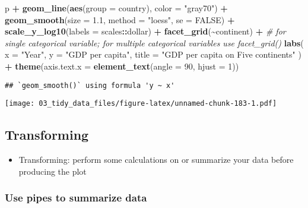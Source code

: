 \documentclass[
]{book}
\newenvironment{Shaded}{\begin{snugshade}}{\end{snugshade}}
\newcommand{\CommentTok}[1]{\textcolor[rgb]{0.56,0.35,0.01}{\textit{#1}}}
\newcommand{\DataTypeTok}[1]{\textcolor[rgb]{0.13,0.29,0.53}{#1}}
\newcommand{\DecValTok}[1]{\textcolor[rgb]{0.00,0.00,0.81}{#1}}
\newcommand{\FloatTok}[1]{\textcolor[rgb]{0.00,0.00,0.81}{#1}}
\newcommand{\KeywordTok}[1]{\textcolor[rgb]{0.13,0.29,0.53}{\textbf{#1}}}
\newcommand{\NormalTok}[1]{#1}
\newcommand{\OperatorTok}[1]{\textcolor[rgb]{0.81,0.36,0.00}{\textbf{#1}}}
\newcommand{\OtherTok}[1]{\textcolor[rgb]{0.56,0.35,0.01}{#1}}
\newcommand{\StringTok}[1]{\textcolor[rgb]{0.31,0.60,0.02}{#1}}
\providecommand{\tightlist}{%
  \setlength{\itemsep}{0pt}\setlength{\parskip}{0pt}}
\begin{document}
\begin{Shaded}
\begin{Highlighting}[]
\NormalTok{p }\OperatorTok{+}\StringTok{ }\KeywordTok{geom\_line}\NormalTok{(}\KeywordTok{aes}\NormalTok{(}\DataTypeTok{group =}\NormalTok{ country), }\DataTypeTok{color =} \StringTok{"gray70"}\NormalTok{) }\OperatorTok{+}
\StringTok{  }\KeywordTok{geom\_smooth}\NormalTok{(}\DataTypeTok{size =} \FloatTok{1.1}\NormalTok{, }\DataTypeTok{method =} \StringTok{"loess"}\NormalTok{, }\DataTypeTok{se =} \OtherTok{FALSE}\NormalTok{) }\OperatorTok{+}
\StringTok{  }\KeywordTok{scale\_y\_log10}\NormalTok{(}\DataTypeTok{labels =}\NormalTok{ scales}\OperatorTok{::}\NormalTok{dollar) }\OperatorTok{+}
\StringTok{  }\KeywordTok{facet\_grid}\NormalTok{(}\OperatorTok{\textasciitilde{}}\NormalTok{continent) }\OperatorTok{+}\StringTok{ }\CommentTok{\# for single categorical variable; for multiple categorical variables use facet\_grid()}
\StringTok{  }\KeywordTok{labs}\NormalTok{(}
    \DataTypeTok{x =} \StringTok{"Year"}\NormalTok{,}
    \DataTypeTok{y =} \StringTok{"GDP per capita"}\NormalTok{,}
    \DataTypeTok{title =} \StringTok{"GDP per capita on Five continents"}
\NormalTok{  ) }\OperatorTok{+}
\StringTok{  }\KeywordTok{theme}\NormalTok{(}\DataTypeTok{axis.text.x =} \KeywordTok{element\_text}\NormalTok{(}\DataTypeTok{angle =} \DecValTok{90}\NormalTok{, }\DataTypeTok{hjust =} \DecValTok{1}\NormalTok{))}
\end{Highlighting}
\end{Shaded}

\begin{verbatim}
## `geom_smooth()` using formula 'y ~ x'
\end{verbatim}

\texttt{[image: 03\_tidy\_data\_files/figure-latex/unnamed-chunk-183-1.pdf]}

\hypertarget{transforming}{%
\subsection{Transforming}\label{transforming}}

\begin{itemize}
\tightlist
\item
  Transforming: perform some calculations on or summarize your data before producing the plot
\end{itemize}

\hypertarget{use-pipes-to-summarize-data}{%
\subsubsection{Use pipes to summarize data}\label{use-pipes-to-summarize-data}}
\end{document}
